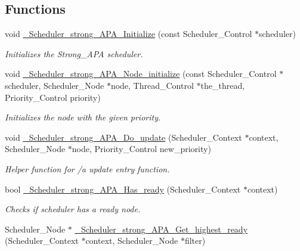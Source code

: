 \subsection*{Functions}
\begin{DoxyCompactItemize}
\item 
void \hyperlink{group__RTEMSScoreSchedulerStrongAPA_gafcd6fde337d7542784698219322b6365}{\+\_\+\+Scheduler\+\_\+strong\+\_\+\+A\+P\+A\+\_\+\+Initialize} (const Scheduler\+\_\+\+Control $\ast$scheduler)
\begin{DoxyCompactList}\small\item\em Initializes the Strong\+\_\+\+A\+PA scheduler. \end{DoxyCompactList}\item 
void \hyperlink{group__RTEMSScoreSchedulerStrongAPA_ga1cde4345d4dc0b5a37a696fa446bb47e}{\+\_\+\+Scheduler\+\_\+strong\+\_\+\+A\+P\+A\+\_\+\+Node\+\_\+initialize} (const Scheduler\+\_\+\+Control $\ast$scheduler, Scheduler\+\_\+\+Node $\ast$node, Thread\+\_\+\+Control $\ast$the\+\_\+thread, Priority\+\_\+\+Control priority)
\begin{DoxyCompactList}\small\item\em Initializes the node with the given priority. \end{DoxyCompactList}\item 
void \hyperlink{group__RTEMSScoreSchedulerStrongAPA_ga093f8f4d503edc228e9819353be72dbc}{\+\_\+\+Scheduler\+\_\+strong\+\_\+\+A\+P\+A\+\_\+\+Do\+\_\+update} (Scheduler\+\_\+\+Context $\ast$context, Scheduler\+\_\+\+Node $\ast$node, Priority\+\_\+\+Control new\+\_\+priority)
\begin{DoxyCompactList}\small\item\em Helper function for /a update entry function. \end{DoxyCompactList}\item 
bool \hyperlink{group__RTEMSScoreSchedulerStrongAPA_ga1eb39ec8e5e7663e5696db912ddf01ba}{\+\_\+\+Scheduler\+\_\+strong\+\_\+\+A\+P\+A\+\_\+\+Has\+\_\+ready} (Scheduler\+\_\+\+Context $\ast$context)
\begin{DoxyCompactList}\small\item\em Checks if scheduler has a ready node. \end{DoxyCompactList}\item 
Scheduler\+\_\+\+Node $\ast$ \hyperlink{group__RTEMSScoreSchedulerStrongAPA_ga8f182f1109d27d916452f6ae77c63d24}{\+\_\+\+Scheduler\+\_\+strong\+\_\+\+A\+P\+A\+\_\+\+Get\+\_\+highest\+\_\+ready} (Scheduler\+\_\+\+Context $\ast$context, Scheduler\+\_\+\+Node $\ast$filter)

\end{DoxyCompactItemize}
